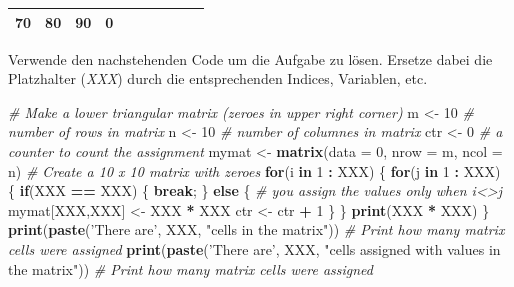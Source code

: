 \documentclass[]{article}
\newenvironment{Shaded}{\begin{snugshade}}{\end{snugshade}}
\newcommand{\KeywordTok}[1]{\textcolor[rgb]{0.13,0.29,0.53}{\textbf{#1}}}
\newcommand{\DataTypeTok}[1]{\textcolor[rgb]{0.13,0.29,0.53}{#1}}
\newcommand{\DecValTok}[1]{\textcolor[rgb]{0.00,0.00,0.81}{#1}}
\newcommand{\StringTok}[1]{\textcolor[rgb]{0.31,0.60,0.02}{#1}}
\newcommand{\CommentTok}[1]{\textcolor[rgb]{0.56,0.35,0.01}{\textit{#1}}}
\newcommand{\ControlFlowTok}[1]{\textcolor[rgb]{0.13,0.29,0.53}{\textbf{#1}}}
\newcommand{\OperatorTok}[1]{\textcolor[rgb]{0.81,0.36,0.00}{\textbf{#1}}}
\newcommand{\NormalTok}[1]{#1}
\begin{document}
\begin{longtable}[]{@{}cccccccccc@{}}
\begin{minipage}[t]{0.05\columnwidth}
70\strut
\end{minipage} & \begin{minipage}[t]{0.05\columnwidth}\centering\strut
80\strut
\end{minipage} & \begin{minipage}[t]{0.05\columnwidth}\centering\strut
90\strut
\end{minipage} & \begin{minipage}[t]{0.05\columnwidth}\centering\strut
0\strut
\end{minipage}\tabularnewline
\bottomrule
\end{longtable}

Verwende den nachstehenden Code um die Aufgabe zu lösen. Ersetze dabei
die Platzhalter (\emph{XXX}) durch die entsprechenden Indices,
Variablen, etc.

\begin{Shaded}
\begin{Highlighting}[]
  \CommentTok{# Make a lower triangular matrix (zeroes in upper right corner)}
\NormalTok{  m     <-}\StringTok{ }\DecValTok{10} \CommentTok{# number of rows in matrix}
\NormalTok{  n     <-}\StringTok{ }\DecValTok{10} \CommentTok{# number of columnes in matrix}
\NormalTok{  ctr   <-}\StringTok{ }\DecValTok{0}  \CommentTok{# a counter to count the assignment}
\NormalTok{  mymat <-}\StringTok{ }\KeywordTok{matrix}\NormalTok{(}\DataTypeTok{data =} \DecValTok{0}\NormalTok{, }\DataTypeTok{nrow =}\NormalTok{ m, }\DataTypeTok{ncol =}\NormalTok{ n) }\CommentTok{# Create a 10 x 10 matrix with zeroes }
  \ControlFlowTok{for}\NormalTok{(i }\ControlFlowTok{in} \DecValTok{1} \OperatorTok{:}\StringTok{ }\NormalTok{XXX) \{}
    \ControlFlowTok{for}\NormalTok{(j }\ControlFlowTok{in} \DecValTok{1} \OperatorTok{:}\StringTok{ }\NormalTok{XXX) \{   }
      \ControlFlowTok{if}\NormalTok{(XXX }\OperatorTok{==}\StringTok{ }\NormalTok{XXX) \{ }
        \ControlFlowTok{break}\NormalTok{;}
\NormalTok{      \} }\ControlFlowTok{else}\NormalTok{ \{}
        \CommentTok{# you assign the values only when i<>j}
\NormalTok{        mymat[XXX,XXX] <-}\StringTok{ }\NormalTok{XXX }\OperatorTok{*}\StringTok{ }\NormalTok{XXX}
\NormalTok{        ctr        <-}\StringTok{ }\NormalTok{ctr }\OperatorTok{+}\StringTok{ }\DecValTok{1}
\NormalTok{      \}}
\NormalTok{    \}}
    \KeywordTok{print}\NormalTok{(XXX }\OperatorTok{*}\StringTok{ }\NormalTok{XXX) }
\NormalTok{  \}}
  \KeywordTok{print}\NormalTok{(}\KeywordTok{paste}\NormalTok{(}\StringTok{'There are'}\NormalTok{, XXX, }\StringTok{"cells in the matrix"}\NormalTok{))  }\CommentTok{# Print how many matrix cells were assigned}
  \KeywordTok{print}\NormalTok{(}\KeywordTok{paste}\NormalTok{(}\StringTok{'There are'}\NormalTok{, XXX, }\StringTok{"cells assigned with values in the matrix"}\NormalTok{))  }\CommentTok{# Print how many matrix cells were assigned  }
\end{Highlighting}
\end{Shaded}
\end{document}
